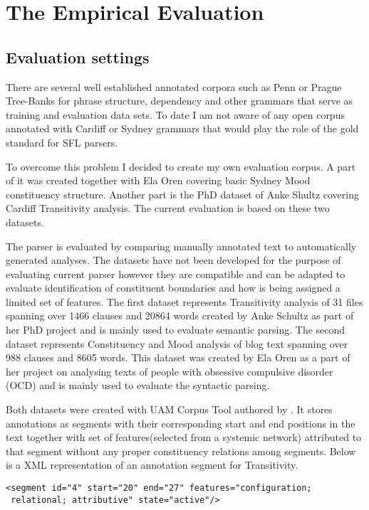 \chapter{The Empirical Evaluation}
\label{ch:evaluation}
\section{Evaluation settings}
There are several well established annotated corpora such as Penn or Prague Tree-Banks for phrase structure, dependency and other grammars that serve as training and evaluation data sets. To date I am not aware of any open corpus annotated with Cardiff or Sydney grammars that would play the role of the gold standard for SFL parsers. 

To overcome this problem I decided to create my own evaluation corpus. A part of it was created together with Ela Oren covering basic Sydney Mood constituency structure. Another part is the PhD dataset of Anke Shultz covering Cardiff Transitivity analysis. The current evaluation is based on these two datasets.

The parser is evaluated by comparing manually annotated text to automatically generated analyses.
The datasets have not been developed for the purpose of evaluating current parser however they are compatible and can be adapted to evaluate identification of constituent boundaries and how is being assigned a limited set of features. The first dataset represents Transitivity analysis of 31 files spanning over 1466 clauses and 20864 words created by Anke Schultz as part of her PhD project and is mainly used to evaluate semantic parsing. The second dataset represents Constituency and Mood analysis of blog text spanning over 988 clauses and 8605 words. This dataset was created by Ela Oren as a part of her project on analysing texts of people with obsessive compulsive disorder (OCD) and is mainly used to evaluate the syntactic parsing.  

Both datasets were created with UAM Corpus Tool authored by \citet{ODonnell2008,ODonnell2008a}. It stores annotations as segments with their corresponding start and end positions in the text together with set of features(selected from a systemic network) attributed to that segment without any proper constituency relations among segments. Below is a XML representation of an annotation  segment for Transitivity.

\begin{verbatim}
<segment id="4" start="20" end="27" features="configuration;
 relational; attributive" state="active"/>
\end{verbatim}

